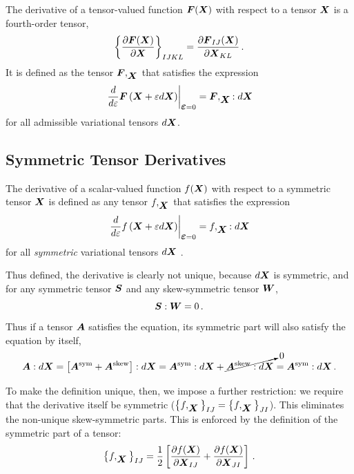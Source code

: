 \documentclass[10pt,letterpaper,oneside]{report}
\newcommand{\ten}[1]{\mbox{\boldmath $#1$}{}}
\newcommand{\scas}[1]{\mbox{{\scriptsize{${\rm{#1}}$}}}{}}
\begin{document}
\begin{itemize}
The derivative of a tensor-valued function $ \ten{F} ( \ten{X} )$ with respect to a tensor $\ten{X}$ is a fourth-order tensor, 
\begin{equation}
\left\lbrace \frac{\partial \ten{F} ( \ten{X} ) }{\partial \ten{X}} \right\rbrace_{IJKL} = \frac{\partial \ten{F}_{IJ} ( \ten{X} ) }{\partial \ten{X}_{KL}} \, .
\end{equation}
It is defined as the tensor $\ten{F},_{\ten{X}}$ that satisfies the expression
\begin{equation}
\left. \frac{d}{d \varepsilon} \ten{F} \left( \ten{X} + \varepsilon d\ten{X} \right) \right|_{\ten{\varepsilon}=0} = \ten{F},_{\ten{X}} : d \ten{X}
\end{equation}
for all admissible variational tensors $d \ten{X}$. 

\subsection{Symmetric Tensor Derivatives}
The derivative of a scalar-valued function $f ( \ten{X} )$ with respect to a symmetric tensor $\ten{X}$ is defined as any tensor $f,_{\ten{X}}$ that satisfies the expression
\begin{equation}
\left. \frac{d}{d \varepsilon} f \left( \ten{X} + \varepsilon d\ten{X} \right) \right|_{\ten{\varepsilon}=0} = f,_{\ten{X}} : d \ten{X}
\end{equation}
for all \textit{symmetric} variational tensors $d \ten{X}$ \cite{Lebedev}.

Thus defined, the derivative is clearly not unique, because $d \ten{X}$ is symmetric, and for any symmetric tensor $\ten{S}$ and any skew-symmetric tensor $\ten{W}$,
\begin{equation}
\ten{S} : \ten{W} = 0 \, .
\end{equation}
Thus if a tensor $\ten{A}$ satisfies the equation, its symmetric part will also satisfy the equation by itself, 
\begin{equation}
\ten{A} : d \ten{X} = \left[ \ten{A}^{\scas{sym}} + \ten{A}^{\scas{skew}} \right] : d \ten{X} = \ten{A}^{\scas{sym}} : d \ten{X} + \cancelto{0}{ \ten{A}^{\scas{skew}} : d \ten{X} } = \ten{A}^{\scas{sym}} : d \ten{X} \, .
\end{equation}

To make the definition unique, then, we impose a further restriction: we require that the derivative itself be symmetric ($\left\lbrace f,_{\ten{X}} \right\rbrace_{IJ} = \left\lbrace f,_{\ten{X}} \right\rbrace_{JI} $).  This eliminates the non-unique skew-symmetric parts.  This is enforced by the definition of the symmetric part of a tensor:
\begin{equation}
\left\lbrace f,_{\ten{X}} \right\rbrace_{IJ} = \frac{1}{2} \left[ \frac{\partial f ( \ten{X} ) }{\partial \ten{X}_{IJ}} + \frac{\partial f ( \ten{X} ) }{\partial \ten{X}_{JI}} \right] \, .
\end{equation}


\end{itemize}
\end{document}
